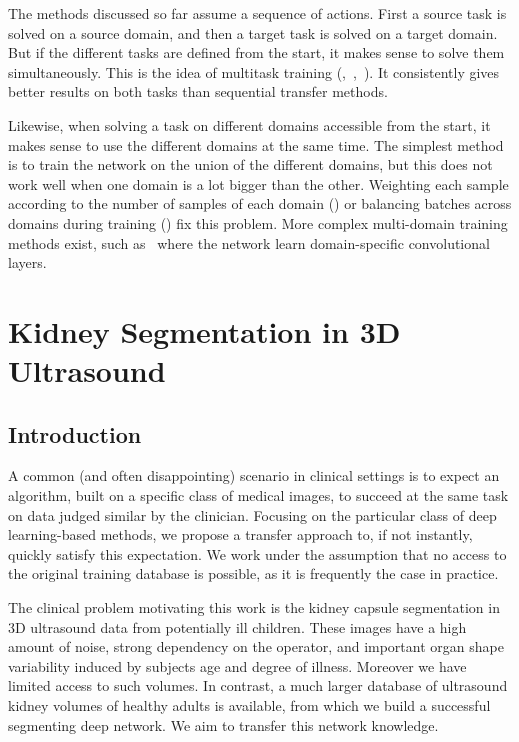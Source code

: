 The methods discussed so far assume a sequence of actions. First a source task is solved on a source domain, and then a target task is solved on a target domain. But if the different tasks are defined from the start, it makes sense to solve them simultaneously. This is the idea of multitask training (\textcite{caruana1995NIPS},~\textcite{caruana1997},~\textcite{collobert2008ICML}). It consistently gives better results on both tasks than sequential transfer methods. 

Likewise, when solving a task on different domains accessible from the start, it makes sense to use the different domains at the same time. The simplest method is to train the network on the union of the different domains, but this does not work well when one domain is a lot bigger than the other. Weighting each sample according to the number of samples of each domain (\textcite{daume2007}) or balancing batches across domains during training (\textcite{buda2017}) fix this problem. More complex multi-domain training methods exist, such as~\textcite{nam2016CVPR} where the network learn domain-specific convolutional layers.





\section{Kidney Segmentation in 3D Ultrasound}
\label{sec:kidney}

\subsection{Introduction}

A common (and often disappointing) scenario in clinical settings is to expect an algorithm, built on a specific class of medical images, to succeed at the same task on data judged similar by the clinician. Focusing on the particular class of deep learning-based methods, we propose a transfer approach to, if not instantly, quickly satisfy this expectation. We work under the assumption that no access to the original training database is possible, as it is frequently the case in practice. 

The clinical problem motivating this work is the kidney capsule segmentation in 3D ultrasound data from potentially ill children. These images have a high amount of noise, strong dependency on the operator, and important organ shape variability induced by subjects age and degree of illness. Moreover we have limited access to such volumes. In contrast, a much larger database of ultrasound kidney volumes of healthy adults is available, from which we build a successful segmenting deep network. We aim to transfer this network knowledge. %

